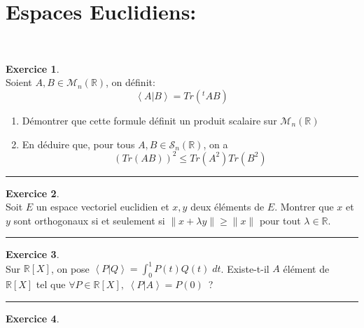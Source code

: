 \documentclass[a4paper,10pt]{article}
\theoremstyle{definition}
\theoremstyle{definition}
\newtheorem{exo}{Exercice}
\newcommand{\R}{\mathbb{R}}
\begin{document}
\section*{Espaces Euclidiens:}\hfill\\%
\begin{minipage}{1\linewidth}
	\begin{minipage}[t]{0.48\linewidth}
		\raggedright
		
		
		
		\begin{exo}\quad\\
			Soient $A,B \in \mathcal{M}_n(\R)$, on définit:
			$$\left\langle A|B\right\rangle = Tr(^tAB) $$
			\begin{enumerate}
				\item Démontrer que cette formule définit un produit scalaire sur $\mathcal{M}_n(\R)$
				\item En déduire que, pour tous $A,B\in\mathcal{S}_n(\R)$, on a 
				$$(Tr(AB))^2 \leq Tr(A^2)Tr(B^2) $$
			\end{enumerate}
			
			\centering
			\rule{1\linewidth}{0.6pt}
		\end{exo}
		
		
		
		\begin{exo}\quad\\
			Soit $E$ un espace vectoriel euclidien et $x,y$ deux éléments de $E$. Montrer que $x$ et $y$ sont orthogonaux si et seulement si $\| x+\lambda y \| \geq \|x\|$ pour tout $\lambda\in\R$.
			
			\centering
			\rule{1\linewidth}{0.6pt}
		\end{exo}
		
		
		\begin{exo}\quad\\
			Sur $\R[X]$, on pose $ \left\langle P|Q\right\rangle =\int_{0}^{1}P(t)Q(t)\;dt$. Existe-t-il $A$ élément de $\R[X]$ tel que $\forall P\in\R[X],\;\left\langle P|A\right\rangle=P(0)$~?
			
			\centering
			\rule{1\linewidth}{0.6pt}
		\end{exo}
		
		
		
		
	\end{minipage}	
	\hfill\vrule\hfill
	\begin{minipage}[t]{0.48\linewidth}
		\raggedright
		
		\begin{exo}\quad\\[0.25cm]
			

\end{exo}
\end{minipage}
\end{minipage}
\end{document}
